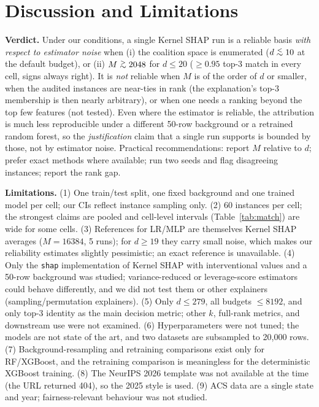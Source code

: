 \documentclass{article}
\newcommand{\gtrsim}{\mathrel{\raisebox{-0.5ex}{$\stackrel{>}{\sim}$}}}
\newcommand{\lesssim}{\mathrel{\raisebox{-0.5ex}{$\stackrel{<}{\sim}$}}}
\begin{document}
\section{Discussion and Limitations}
\textbf{Verdict.} Under our conditions, a single Kernel SHAP run is a reliable basis \emph{with respect to estimator noise} when (i) the coalition space is enumerated ($d\lesssim10$ at the default budget), or (ii) $M\gtrsim2048$ for $d\le20$ ($\ge0.95$ top-3 match in every cell, signs always right). It is \emph{not} reliable when $M$ is of the order of $d$ or smaller, when the audited instances are near-ties in rank (the explanation's top-3 membership is then nearly arbitrary), or when one needs a ranking beyond the top few features (not tested). Even where the estimator is reliable, the attribution is much less reproducible under a different 50-row background or a retrained random forest, so the \emph{justification} claim that a single run supports is bounded by those, not by estimator noise. Practical recommendations: report $M$ relative to $d$; prefer exact methods where available; run two seeds and flag disagreeing instances; report the rank gap.

\textbf{Limitations.} (1) One train/test split, one fixed background and one trained model per cell; our CIs reflect instance sampling only. (2) 60 instances per cell; the strongest claims are pooled and cell-level intervals (Table~\ref{tab:match}) are wide for some cells. (3) References for LR/MLP are themselves Kernel SHAP averages ($M{=}16384$, 5 runs); for $d\ge19$ they carry small noise, which makes our reliability estimates slightly pessimistic; an exact reference is unavailable. (4) Only the \texttt{shap} implementation of Kernel SHAP with interventional values and a 50-row background was studied; variance-reduced or leverage-score estimators \citep{covert2021,musco2024} could behave differently, and we did not test them or other explainers (sampling/permutation explainers). (5) Only $d\le279$, all budgets $\le8192$, and only top-3 identity as the main decision metric; other $k$, full-rank metrics, and downstream use were not examined. (6) Hyperparameters were not tuned; the models are not state of the art, and two datasets are subsampled to 20{,}000 rows. (7) Background-resampling and retraining comparisons exist only for RF/XGBoost, and the retraining comparison is meaningless for the deterministic XGBoost training. (8) The NeurIPS 2026 template was not available at the time (the URL returned 404), so the 2025 style is used. (9) ACS data are a single state and year; fairness-relevant behaviour was not studied.
\end{document}
